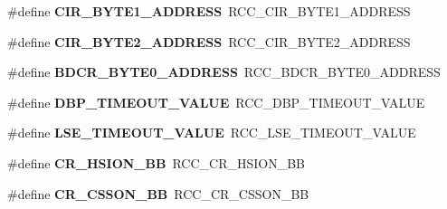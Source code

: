 \begin{DoxyCompactItemize}
\item 
\#define {\bfseries C\+I\+R\+\_\+\+B\+Y\+T\+E1\+\_\+\+A\+D\+D\+R\+E\+SS}~R\+C\+C\+\_\+\+C\+I\+R\+\_\+\+B\+Y\+T\+E1\+\_\+\+A\+D\+D\+R\+E\+SS\hypertarget{group___h_a_l___r_c_c___aliased_ga159aa247b8dc96a030bcb9b43ece4256}{}\label{group___h_a_l___r_c_c___aliased_ga159aa247b8dc96a030bcb9b43ece4256}

\item 
\#define {\bfseries C\+I\+R\+\_\+\+B\+Y\+T\+E2\+\_\+\+A\+D\+D\+R\+E\+SS}~R\+C\+C\+\_\+\+C\+I\+R\+\_\+\+B\+Y\+T\+E2\+\_\+\+A\+D\+D\+R\+E\+SS\hypertarget{group___h_a_l___r_c_c___aliased_gaab58c3f3f81bf1ab9a14cf3fececd8c4}{}\label{group___h_a_l___r_c_c___aliased_gaab58c3f3f81bf1ab9a14cf3fececd8c4}

\item 
\#define {\bfseries B\+D\+C\+R\+\_\+\+B\+Y\+T\+E0\+\_\+\+A\+D\+D\+R\+E\+SS}~R\+C\+C\+\_\+\+B\+D\+C\+R\+\_\+\+B\+Y\+T\+E0\+\_\+\+A\+D\+D\+R\+E\+SS\hypertarget{group___h_a_l___r_c_c___aliased_ga991be15dda03061a29712e8206a32510}{}\label{group___h_a_l___r_c_c___aliased_ga991be15dda03061a29712e8206a32510}

\item 
\#define {\bfseries D\+B\+P\+\_\+\+T\+I\+M\+E\+O\+U\+T\+\_\+\+V\+A\+L\+UE}~R\+C\+C\+\_\+\+D\+B\+P\+\_\+\+T\+I\+M\+E\+O\+U\+T\+\_\+\+V\+A\+L\+UE\hypertarget{group___h_a_l___r_c_c___aliased_ga3508fa29d62b42d7d9117c419e076efc}{}\label{group___h_a_l___r_c_c___aliased_ga3508fa29d62b42d7d9117c419e076efc}

\item 
\#define {\bfseries L\+S\+E\+\_\+\+T\+I\+M\+E\+O\+U\+T\+\_\+\+V\+A\+L\+UE}~R\+C\+C\+\_\+\+L\+S\+E\+\_\+\+T\+I\+M\+E\+O\+U\+T\+\_\+\+V\+A\+L\+UE\hypertarget{group___h_a_l___r_c_c___aliased_ga0965572baea57cdfd3616bef14d41053}{}\label{group___h_a_l___r_c_c___aliased_ga0965572baea57cdfd3616bef14d41053}

\item 
\#define {\bfseries C\+R\+\_\+\+H\+S\+I\+O\+N\+\_\+\+BB}~R\+C\+C\+\_\+\+C\+R\+\_\+\+H\+S\+I\+O\+N\+\_\+\+BB\hypertarget{group___h_a_l___r_c_c___aliased_gac3290a833c0e35ec17d32c2d494e6133}{}\label{group___h_a_l___r_c_c___aliased_gac3290a833c0e35ec17d32c2d494e6133}

\item 
\#define {\bfseries C\+R\+\_\+\+C\+S\+S\+O\+N\+\_\+\+BB}~R\+C\+C\+\_\+\+C\+R\+\_\+\+C\+S\+S\+O\+N\+\_\+\+BB\hypertarget{group___h_a_l___r_c_c___aliased_gaca914aed10477ae4090fea0a9639b1ea}{}\label{group___h_a_l___r_c_c___aliased_gaca914aed10477ae4090fea0a9639b1ea}


\end{DoxyCompactItemize}
